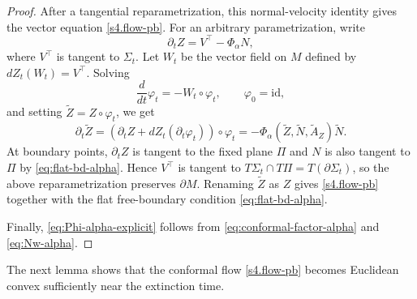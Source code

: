\documentclass[11pt, reqno]{amsart}
\theoremstyle{remark}
\theoremstyle{definition}
\numberwithin{equation}{section}
\newcommand{\PiH}{\Pi}
\begin{document}
\begin{proof}
After a tangential reparametrization, this normal-velocity identity gives the vector equation \eqref{s4.flow-pb}.  For an arbitrary parametrization, write
\begin{equation*}
        \partial_tZ=V^{\top}-\Phi_\alpha N,
\end{equation*}
where $V^{\top}$ is tangent to $\Sigma_t$.  Let $W_t$ be the vector field on
$M$ defined by $dZ_t(W_t)=V^{\top}$.  Solving
\begin{equation*}
        \frac{d}{dt}\varphi_t=-W_t\circ\varphi_t,
        \qquad \varphi_0=\mathrm{id},
\end{equation*}
and setting $\widetilde Z=Z\circ\varphi_t$, we get
\begin{equation*}
        \partial_t\widetilde Z
        =\left(\partial_tZ+dZ_t(\partial_t\varphi_t)\right)\circ\varphi_t
        =-\Phi_\alpha(\widetilde Z,\widetilde N,\widetilde A_Z)\widetilde N.
\end{equation*}
At boundary points, $\partial_tZ$ is tangent to the fixed plane $\PiH$ and
$N$ is also tangent to $\PiH$ by \eqref{eq:flat-bd-alpha}.  Hence $V^{\top}$
is tangent to $T\Sigma_t\cap T\PiH=T(\partial\Sigma_t)$, so the above
reparametrization preserves $\partial M$.  Renaming $\widetilde Z$ as $Z$
gives \eqref{s4.flow-pb} together with the flat free-boundary condition \eqref{eq:flat-bd-alpha}.

Finally, \eqref{eq:Phi-alpha-explicit} follows from
\eqref{eq:conformal-factor-alpha} and \eqref{eq:Nw-alpha}.
\end{proof}

The next lemma shows that the conformal flow \eqref{s4.flow-pb} becomes Euclidean convex sufficiently near the extinction time.
\end{document}
